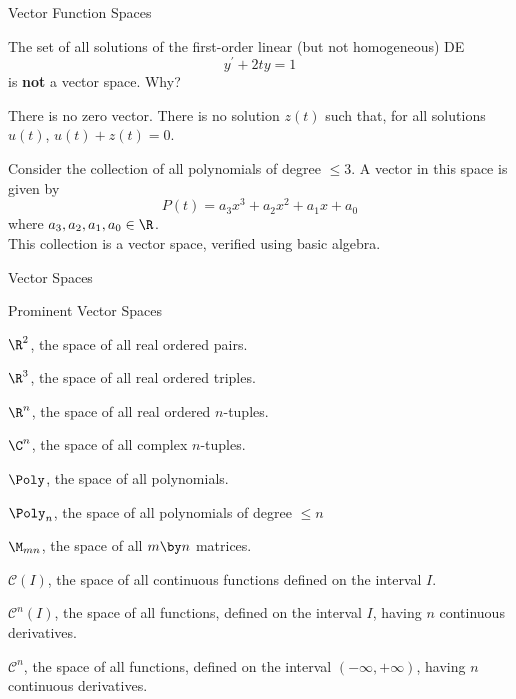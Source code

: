 \documentclass{beamer}
\begin{document}
\begin{frame}{Vector Function Spaces}
\begin{example}
The set of all solutions of the first-order linear (but not homogeneous) DE
\begin{equation*}
y^\prime+2ty=1
\end{equation*}
is \textbf{not} a vector space. Why?\pause

\vspace{0.25cm}
There is no zero vector. There is no solution $z(t)$ such that, for all solutions $u(t)$, $u(t)+z(t)=0$.
\end{example}\pause

\begin{example}
Consider the collection of all polynomials of degree $\leq 3$. A vector in this space is given by
\begin{equation*}
P(t)=a_3x^3+a_2x^2+a_1x+a_0
\end{equation*}
where $a_3,a_2,a_1,a_0\in\R$.\\This collection is a vector space, verified using basic algebra.
\end{example}
\end{frame}

\begin{frame}{Vector Spaces}
\begin{block}{Prominent Vector Spaces}
\begin{dynitemize}[<+- | alert@+>]
\item $\R^2$, the space of all real ordered pairs.
\item $\R^3$, the space of all real ordered triples.
\item $\R^n$, the space of all real ordered $n$-tuples.
\item $\C^n$, the space of all complex $n$-tuples.
\item $\Poly$, the space of all polynomials.
\item $\Poly_n$, the space of all polynomials of degree $\leq n$
\item $\M_{mn}$, the space of all $m \by n$ matrices.
\item $\mathcal{C}(I)$, the space of all continuous functions defined on the interval $I$.
\item $\mathcal{C}^n(I)$, the space of all functions, defined on the interval $I$, having $n$ continuous derivatives.
\item $\mathcal{C}^n$, the space of all functions, defined on the interval $(-\infty,+\infty)$, having $n$ continuous derivatives.
\end{dynitemize}
\end{block}
\end{frame}
\end{document}
